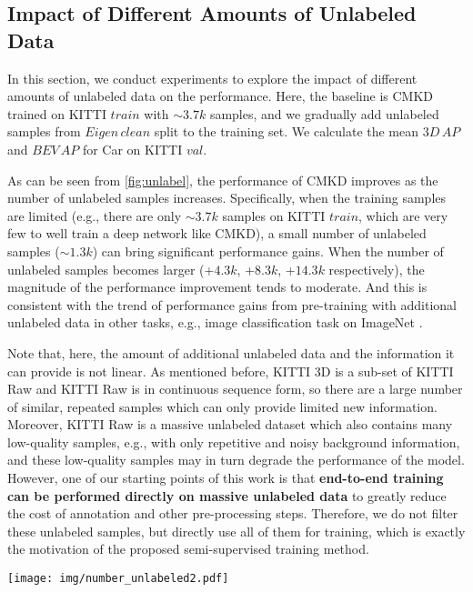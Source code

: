 \documentclass[runningheads]{llncs}
\begin{document}
\subsection{Impact of Different Amounts of Unlabeled Data}
\label{sec:num unlabel}
In this section, we conduct experiments to explore the impact of different amounts of unlabeled data on the performance. Here, the baseline is CMKD trained on KITTI $train$ with $\sim3.7k$ samples, and we gradually add unlabeled samples from $Eigen\,clean$ split to the training set. We calculate the mean $3D\,AP$ and $BEV\,AP$ for Car on KITTI $val$.

As can be seen from \cref{fig:unlabel}, the performance of CMKD improves as the number of unlabeled samples increases. 
Specifically, when the training samples are limited (e.g., there are only $\sim3.7k$ samples on KITTI $train$, which are very few to well train a deep network like CMKD), a small number of unlabeled samples ($\sim1.3k$) can bring significant performance gains.
When the number of unlabeled samples becomes larger (+$4.3k$, +$8.3k$, +$14.3k$ respectively), the magnitude of the performance improvement tends to moderate.
And this is consistent with the trend of performance gains from pre-training with additional unlabeled data in other tasks, e.g., image classification task on ImageNet \cite{imagenet}.

Note that, here, the amount of additional unlabeled data and the information it can provide is not linear. 
As mentioned before, KITTI 3D is a sub-set of KITTI Raw and KITTI Raw is in continuous sequence form, so there are a large number of similar, repeated samples which can only provide limited new information.
Moreover, KITTI Raw is a massive unlabeled dataset which also contains many low-quality samples, e.g., with only repetitive and noisy background information, and these low-quality samples may in turn degrade the performance of the model.
However, one of our starting points of this work is that \textbf{end-to-end training can be performed directly on massive unlabeled data} to greatly reduce the cost of annotation and other pre-processing steps. 
Therefore, we do not filter these unlabeled samples, but directly use all of them for training, which is exactly the motivation of the proposed semi-supervised training method.

\begin{figure*}[t]
  \centering
   \texttt{[image: img/number\_unlabeled2.pdf]}
   \caption{Impact of different amounts of unlabeled data to the performance. We use CMKD trained on KITTI $train$ with $\sim3.7k$ samples as the baseline and gradually add unlabeled samples from $Eigen\,clean$ split to the training set. We calculate the mean $3D\,AP$ and $BEV\,AP$ for Car on KITTI $val$.}
   \label{fig:unlabel}
   \vspace{+5mm}
\end{figure*}
\end{document}
